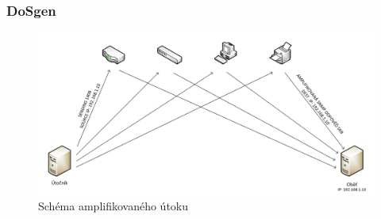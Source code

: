 \documentclass[%
12pt,       				%
t,                  %
aspectratio=1610,   %
unicode,						%
czech,              %
]{beamer}				    	%
\begin{document}
\begin{frame}
\frametitle{DoSgen}
\begin{figure}%
	\centering
	\vspace{0.3cm}	              %
	\includegraphics[width=0.9\columnwidth]{obrazky/snmp_flood_schema.png}
	\caption{Schéma amplifikovaného útoku}%
\end{figure}
\end{frame}

\end{document}
